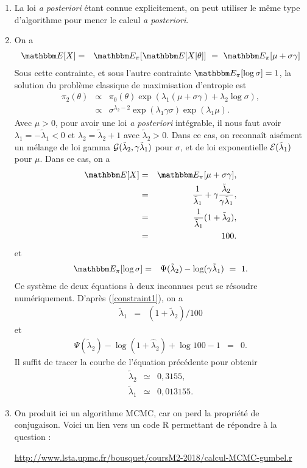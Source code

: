 \begin{enumerate}
\item La loi {\it a posteriori} étant connue explicitement, on peut utiliser le même type d'algorithme pour mener le calcul {\it a posteriori}. 
\item On a 
\begin{eqnarray*}
\E[X] & = & \E_{\pi}[\E[X|\theta]] \ = \ \E_{\pi}[\mu+\sigma\gamma]
\end{eqnarray*}
Sous cette contrainte, et sous l'autre contrainte $\E_{\pi}[\log \sigma]  =  1$, la solution du problème classique de maximisation d'entropie est
\begin{eqnarray*}
\pi_2(\theta) & \propto & \pi_0(\theta) \exp(\lambda_1(\mu + \sigma\gamma) + \lambda_2 \log \sigma), \\
& \propto & \sigma^{\lambda_2-2} \exp(\lambda_1 \gamma \sigma) \exp(\lambda_1\mu).
\end{eqnarray*}
Avec $\mu>0$, pour avoir une loi {\it a posteriori} intégrable, il nous faut avoir $\lambda_1=-\tilde{\lambda}_1<0$ et $\lambda_2=\tilde{\lambda}_2 + 1$ avec $\tilde{\lambda}_2>0$. Dans ce cas, on reconnaît aisément un mélange de loi gamma ${\cal{G}}(\tilde{\lambda}_2,\gamma\tilde{\lambda}_1)$ pour $\sigma$, et de loi exponentielle ${\cal{E}}(\tilde{\lambda}_1)$ pour $\mu$. Dans ce cas, on a 
\begin{eqnarray}
\E[X] & = & \E_{\pi}[\mu+\sigma\gamma], \nonumber \\
         & =  & \frac{1}{\tilde{\lambda}_1} + \gamma\frac{\tilde{\lambda}_2}{\gamma\tilde{\lambda}_1}, \nonumber \\
         & = &  \frac{1}{\tilde{\lambda}_1}(1 + \tilde{\lambda}_2),\nonumber \\
         & = & 100. \label{constraint1}
\end{eqnarray}
et 
\begin{eqnarray*}
\E_{\pi}[\log \sigma] & = & \Psi(\tilde{\lambda}_2)-\log(\gamma\tilde{\lambda}_1) \ = \ 1.
\end{eqnarray*}
Ce système de deux équations à deux inconnues peut se résoudre numériquement. D'après (\ref{constraint1}), on a
\begin{eqnarray*}
\tilde{\lambda}_1 & = & (1 + \tilde{\lambda}_2)/100
\end{eqnarray*}
et
\begin{eqnarray*}
\Psi(\tilde{\lambda}_2) -  \log(1 + \hat{\lambda}_2) + \log 100 - 1 & = & 0.
\end{eqnarray*}
Il suffit de tracer la courbe de l'équation précédente pour obtenir 
\begin{eqnarray*}
\tilde{\lambda}_2 & \simeq & 0,3155, \\
\tilde{\lambda}_1 & \simeq & 0,013155.
\end{eqnarray*}
\item On produit ici un algorithme MCMC, car on perd la propriété de conjugaison. Voici un lien vers un code R permettant de répondre à la question : \\
\begin{center}
\url{http://www.lsta.upmc.fr/bousquet/coursM2-2018/calcul-MCMC-gumbel.r}
\end{center}

\end{enumerate}



